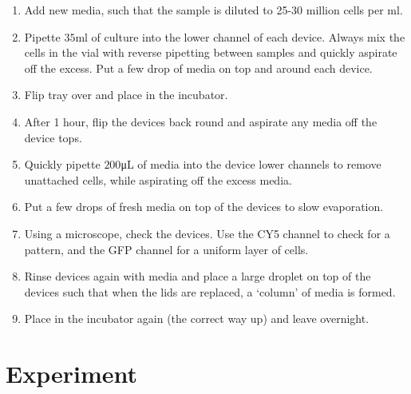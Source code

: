 \begin{enumerate}
	\item Add new media, such that the sample is diluted to 25-30 million cells per ml.
	\item Pipette $35  \unit{\ml}$ of culture into the lower channel of each device. Always mix the cells in the vial with reverse pipetting between samples and quickly aspirate off the excess. Put a few drop of media on top and around each device.
	\item Flip tray over and place in the incubator.
	\item After 1 hour, flip the devices back round and aspirate any media off the device tops.
	\item Quickly pipette $200  $\unit{\uL} of media into the device lower channels to remove unattached cells, while aspirating off the excess media.
	\item Put a few drops of fresh media on top of the devices to slow evaporation.
	\item Using a microscope, check the devices. Use the CY5 channel to check for a pattern, and the GFP channel for a uniform layer of cells.
	\item Rinse devices again with media and place a large droplet on top of the devices such that when the lids are replaced, a `column' of media is formed.
	\item Place in the incubator again (the correct way up) and leave overnight.
\end{enumerate}

\section{Experiment}

